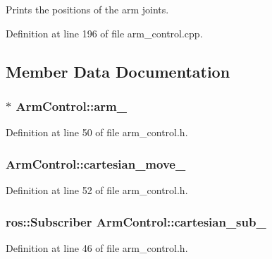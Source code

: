 \-Prints the positions of the arm joints. 



\-Definition at line 196 of file arm\-\_\-control.\-cpp.



\subsection{\-Member \-Data \-Documentation}
\subsubsection[{arm\-\_\-}]{$\ast$ {\bf \-Arm\-Control\-::arm\-\_\-}\hspace{0.3cm}{\ttfamily  [private]}}\label{classArmControl_af06b9f6f206277e7100bba772c91c04f}


\-Definition at line 50 of file arm\-\_\-control.\-h.

\subsubsection[{cartesian\-\_\-move\-\_\-}]{ {\bf \-Arm\-Control\-::cartesian\-\_\-move\-\_\-}\hspace{0.3cm}{\ttfamily  [private]}}\label{classArmControl_aac4f84304fb05a479ec652fd9063d83d}


\-Definition at line 52 of file arm\-\_\-control.\-h.

\subsubsection[{cartesian\-\_\-sub\-\_\-}]{\setlength{\rightskip}{0pt plus 5cm}ros\-::\-Subscriber {\bf \-Arm\-Control\-::cartesian\-\_\-sub\-\_\-}\hspace{0.3cm}{\ttfamily  [private]}}\label{classArmControl_aae25864b22982a34d0cbe530a11cd0c1}


\-Definition at line 46 of file arm\-\_\-control.\-h.

